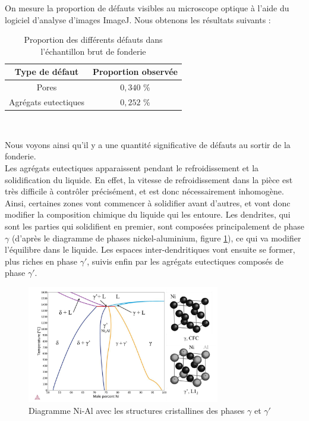 On mesure la proportion de défauts visibles au microscope optique à l'aide du 
logiciel d'analyse d'images ImageJ. Nous obtenons les résultats suivants : \\


\begin{table}[H]
    \centering
    \caption{Proportion des différents défauts dans l'échantillon brut de fonderie}
    \begin{tabular}{|c|c|}
        \hline
        \textbf{Type de défaut}  & \textbf{Proportion observée}  \\
        \hline
        Pores               & $0,340$ \% \\
        Agrégats eutectiques & $0,252$ \% \\
        \hline
    \end{tabular}
    \\
    \label{tab:proportions_defauts_brut}
\end{table}


Nous voyons ainsi qu'il y a une quantité significative de défauts au sortir de la fonderie.\\


Les agrégats eutectiques apparaissent pendant le refroidissement 
et la solidification du liquide. En effet, la vitesse de refroidissement dans 
la pièce est très difficile à contrôler précisément, et est donc nécessairement
inhomogène. Ainsi, certaines zones vont commencer à solidifier avant d'autres, et 
vont donc modifier la composition chimique du liquide qui les entoure. 
Les dendrites, qui sont les parties qui solidifient en premier, sont composées 
principalement de phase $\gamma$ (d'après le diagramme de phases nickel-aluminium, 
figure \ref{fig:diagramme_phases_Ni_Al}), ce qui va modifier l'équilibre dans le liquide.
Les espaces inter-dendritiques vont ensuite se former,  plus riches en phase $\gamma'$, 
suivis enfin par les agrégats eutectiques composés de phase $\gamma'$.


\begin{figure}[H]
    \centering
    \includegraphics[width=0.75\textwidth]{images/diagramme_phase.png}
    \caption{Diagramme Ni-Al avec les structures cristallines des phases $\gamma$ et $\gamma'$}
    \label{fig:diagramme_phases_Ni_Al}
\end{figure}


